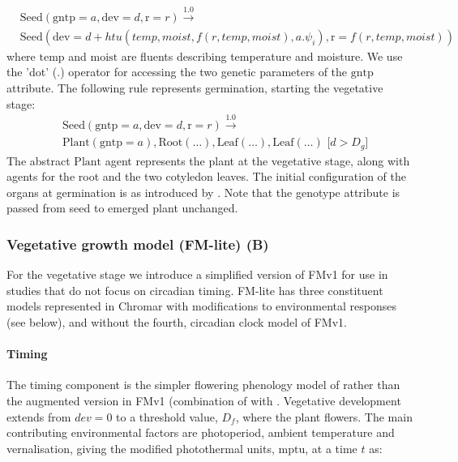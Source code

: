 \documentclass[phd]{infthesis}
\newcommand{\mr}[1]{\mathrm{#1}}
\newcommand{\ar}[2]{\mr{#1} \! = \! {#2}}
\begin{document}
\begin{equation*}
\begin{split}
& \mr{Seed}(\ar{gntp}{a}, \ar{dev}{d}, \ar{r}{r}) \xrightarrow{1.0} \\ 
&\mr{Seed}(\ar{dev}{d + htu(temp, moist, f(r,temp,moist), a.\psi_i)}, 
\ar{r}{f(r, temp, moist)})
\end{split}
\end{equation*}
where \(\mr{temp}\) and \(\mr{moist}\) are fluents describing
temperature and moisture. We use the 'dot' (\(.\)) operator for
accessing the two genetic parameters of the \(\mr{gntp}\) attribute.
The following rule represents germination, starting the vegetative
stage:
\begin{equation*}
\begin{split}
& \mr{Seed}(\ar{gntp}{a},\ar{dev}{d},\ar{r}{r} ) \xrightarrow{1.0} \\
& \mr{Plant}(\ar{gntp}{a}), \mr{Root}(\ldots),\mr{Leaf}( \ldots ), \mr{Leaf}(\ldots) \, \, \lbrack d > D_{g}\rbrack
\end{split}
\end{equation*}
The abstract \(\mr{Plant}\) agent represents the plant at the vegetative
stage, along with agents for the root and the two cotyledon leaves. The initial
configuration of the organs at germination is as introduced by
\citet{chew_multiscale_2014}. Note that the genotype attribute is passed from
seed to emerged plant unchanged.

\subsubsection{Vegetative growth model (FM-lite) (B)}
\label{vegetative-growth-model-fm-lite-b}

For the vegetative stage we introduce a simplified version of FMv1
\citep{chew_multiscale_2014} for use in studies that do not focus on circadian
timing. FM-lite has three constituent models represented in Chromar with
modifications to environmental responses (see below), and without the fourth,
circadian clock model of FMv1.

\paragraph{Timing}
\label{timing}

The timing component is the simpler flowering phenology model of
\citet{wilczek_effects_2009} rather than the augmented version in FMv1
(combination of \citet{chew_augmented_2012} with
\citet{salazar_prediction_2009}. Vegetative development extends from \(dev = 0\)
to a threshold value, \(D_{f}\), where the plant flowers. The main contributing
environmental factors are photoperiod, ambient temperature and vernalisation,
giving the modified photothermal units, \(\mr{mptu}\), at a time \(t\) as:
\end{document}

